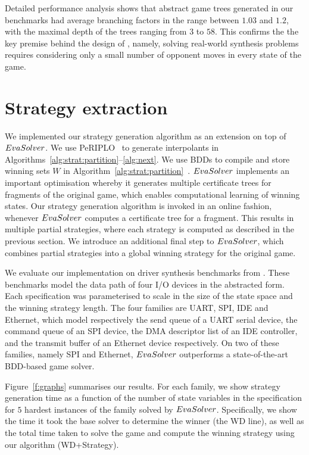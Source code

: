 {Detailed performance analysis shows that 
abstract game trees generated in our benchmarks had average 
branching factors in the range between $1.03$ and $1.2$, with 
the maximal depth of the trees ranging from $3$ to $58$.  This
confirms the the key premise behind the design of \eva, namely, 
solving real-world synthesis problems requires considering only a 
small number of opponent moves in every state of the game.}  

\section{Strategy extraction}

We implemented our strategy generation algorithm as an extension
on top of $EvaSolver$.  We use PeRIPLO~\cite{raey} to generate 
interpolants in 
Algorithms~\ref{alg:strat:partition}--\ref{alg:next}.  We use BDDs
to compile and store winning sets $W$ in 
Algorithm~\ref{alg:strat:partition}~\cite{cudd}.  $EvaSolver$
implements an important optimisation whereby it generates multiple 
certificate trees for fragments of the original game,
which enables computational learning of winning states.  
Our strategy generation algorithm is invoked in an online 
fashion, whenever $EvaSolver$ computes a certificate tree for a 
fragment.  This results in multiple partial strategies, where each 
strategy is computed as described in the previous section.  We 
introduce an additional final step to $EvaSolver$, which combines 
partial strategies into a global winning strategy for the original 
game.

We evaluate our implementation on driver synthesis benchmarks from
\cite{NarodytskaLBRW14}.  These benchmarks model the data path of
four I/O devices in the abstracted form.  Each specification was
parameterised to scale in the size of the state space and the
winning strategy length.  The four families are UART, SPI, IDE and
Ethernet, which model respectively the send queue of a UART serial
device, the command queue of an SPI device, the DMA descriptor
list of an IDE controller, and the transmit buffer of an Ethernet
device respectively.  On two of these families, namely SPI and
Ethernet, $EvaSolver$ outperforms a state-of-the-art BDD-based game
solver.

Figure~\ref{f:graphs} summarises our results.
For each family, we show strategy generation
time as a function of the number of state variables in the
specification for $5$ hardest instances of the family solved by
$EvaSolver$.  Specifically, we show the time it took the base solver to
determine the winner (the WD line), as well as the total time
taken to solve the game and compute the winning strategy using our
algorithm (WD+Strategy).


